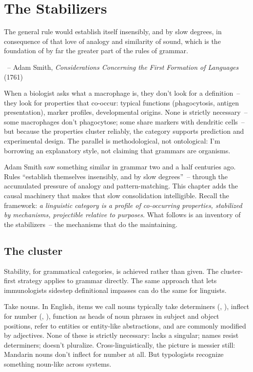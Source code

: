 
\chapter{The Stabilizers}
\label{ch:stabilizers}

\epigraph{The general rule would establish itself insensibly, and by slow degrees, in consequence of that love of analogy and similarity of sound, which is the foundation of by far the greater part of the rules of grammar.}{~-- Adam Smith, \textit{Considerations Concerning the First Formation of Languages} (1761)}

When a biologist asks what a macrophage is, they don't look for a definition~-- they look for properties that co-occur: typical functions (phagocytosis, antigen presentation), marker profiles, developmental origins. None is strictly necessary~-- some macrophages don't phagocytose; some share markers with dendritic cells~-- but because the properties cluster reliably, the category supports prediction and experimental design. The parallel is methodological, not ontological: I'm borrowing an explanatory style, not claiming that grammars are organisms.

Adam Smith saw something similar in grammar two and a half centuries ago. Rules \enquote{establish themselves insensibly, and by slow degrees}~-- through the accumulated pressure of analogy and pattern-matching. This chapter adds the causal machinery that makes that slow consolidation intelligible. Recall the framework: \emph{a linguistic category is a profile of co-occurring properties, stabilized by mechanisms, projectible relative to purposes}. What follows is an inventory of the stabilizers~-- the mechanisms that do the maintaining.


\section{The cluster}
\label{sec:6:the-cluster}

Stability, for grammatical categories, is achieved rather than given. The cluster-first strategy applies to grammar directly. The same approach that lets immunologists sidestep definitional impasses can do the same for linguists.

Take nouns. In English, items we call nouns typically take determiners (, ), inflect for number (, ), function as heads of noun phrases in subject and object positions, refer to entities or entity-like abstractions, and are commonly modified by adjectives. None of these is strictly necessary:  lacks a singular; names resist determiners;  doesn't pluralize. Cross-linguistically, the picture is messier still: Mandarin nouns don't inflect for number at all. But typologists recognize something noun-like across systems.

